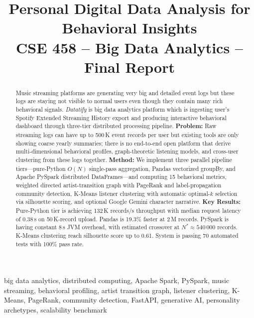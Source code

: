 \documentclass[conference]{IEEEtran}
\begin{document}
\title{Personal Digital Data Analysis for Behavioral Insights\\
{\large CSE 458 -- Big Data Analytics -- Final Report}}

\author{
}

\maketitle

\begin{abstract}
Music streaming platforms are generating very big and detailed event logs but these logs are staying not visible to normal users even though they contain many rich behavioral signals.
\textit{Datatify} is big data analytics platform which is ingesting user's Spotify Extended Streaming History export and producing interactive behavioral dashboard through three-tier distributed processing pipeline.
\textbf{Problem:} Raw streaming logs can have up to 500\,K event records per user but existing tools are only showing coarse yearly summaries; there is no end-to-end open platform that derive multi-dimensional behavioral profiles, graph-theoretic listening models, and cross-user clustering from these logs together.
\textbf{Method:} We implement three parallel pipeline tiers---pure-Python $O(N)$ single-pass aggregation, Pandas vectorized groupBy, and Apache PySpark distributed DataFrames---and computing 15 behavioral metrics, weighted directed artist-transition graph with PageRank and label-propagation community detection, K-Means listener clustering with automatic optimal-$k$ selection via silhouette scoring, and optional Google Gemini character narrative.
\textbf{Key Results:} Pure-Python tier is achieving 132\,K records/s throughput with median request latency of 0.38\,s on 50\,K-record upload. Pandas is 19.3\% faster at 2\,M records. PySpark is having constant 8\,s JVM overhead, with estimated crossover at $N^* \approx 540\,000$ records. K-Means clustering reach silhouette score up to 0.61. System is passing 70 automated tests with 100\% pass rate.
\end{abstract}

\begin{IEEEkeywords}
big data analytics, distributed computing, Apache Spark, PySpark,
music streaming, behavioral profiling, artist transition graph,
listener clustering, K-Means, PageRank, community detection, FastAPI,
generative AI, personality archetypes, scalability benchmark
\end{IEEEkeywords}
\end{document}
